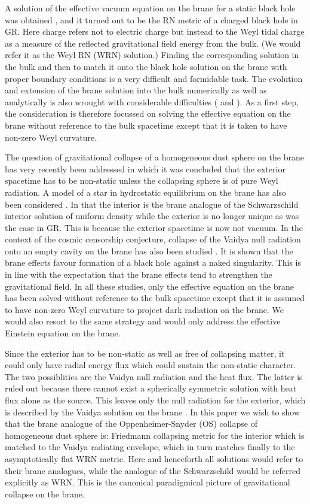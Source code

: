 \documentclass[a4paper,twocolumn,showpacs,preprintnumbers,amsmath,amssymb]{revtex4}
\begin{document}
A solution of the effective vacuum equation on the brane for a static black
hole was obtained \cite{r6}, and it turned out to be the RN metric of a charged
black hole in GR. Here charge refers not to electric charge but instead to
the Weyl tidal charge as a measure of the reflected gravitational field
energy from the bulk. (We would refer it as the Weyl RN (WRN) solution.) 
Finding the corresponding solution in the bulk and then to
match it
onto the black hole solution on the brane with proper boundary conditions
is a very difficult and formidable task. The evolution and extension 
of the brane solution into the bulk numerically as well as analytically is 
also wrought
with considerable difficulties (\cite{r8} and \cite{rsd}). As a first step, 
the consideration
is therefore focussed on solving the effective equation on the brane without
reference to the bulk spacetime except that it is taken to have non-zero 
Weyl curvature. 


The question of gravitational collapse of a homogeneous dust sphere on the 
brane has very recently been addressed \cite{r} in which it was concluded 
that the exterior spacetime has to be non-static unless the collapsing sphere is 
of pure Weyl 
radiation. A model of a star in hydrostatic equilibrium on the brane has also 
been considered \cite{r7}. 
In that the interior is the brane analogue of the Schwarzschild interior 
solution of uniform density while the exterior is no longer unique as was the 
case in GR. This is because the exterior spacetime is now not vacuum. In the 
context of the cosmic censorship conjecture, collapse of the Vaidya null 
radiation onto an empty cavity on the brane has also been studied \cite{n2}. 
It is 
shown that the brane effects favour formation of a black hole against a naked 
singularity. This is in line with the expectation that the brane effects tend 
to strengthen the gravitational field. In all these studies, only the 
effective equation on the brane has been solved without reference to the bulk 
spacetime except that it is assumed to have  
non-zero Weyl curvature to project dark radiation on the brane. We would also 
resort to the same strategy and would only address the effective Einstein 
equation on the brane. 


Since the exterior has to be non-static as well as free of collapsing matter, 
it could only have radial energy flux which could sustain the non-static 
character. The two possiblities are the Vaidya null radiation and the heat 
flux. The latter is ruled out because there cannot exist a spherically 
symmetric solution with heat flux alone as the source. This leaves 
only the null radiation for the exterior, which is described by the Vaidya solution 
on the brane \cite{n2}. 
In this paper we wish to show that the brane analogue of the 
Oppenheimer-Snyder (OS) collapse of homogeneous dust sphere is: Friedmann 
collapsing metric for the interior which is matched to the Vaidya radiating envelope,
which in turn matches finally to the asymptotically flat WRN metric. 
Here and henceforth all solutions would refer to their brane analogues, while 
the analogue of the Schwarzschild would be referred explicitly as WRN. This is the 
canonical paradigmical picture of gravitational collapse on the brane.
\end{document}
